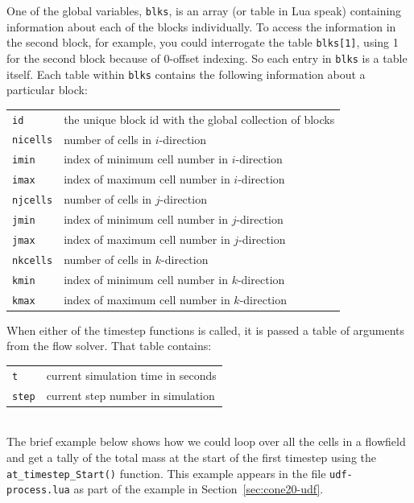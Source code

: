 One of the global variables, \verb!blks!, is an array (or table in Lua speak) containing information 
about each of the blocks individually.
To access the information in the second block, for example, you could interrogate
the table \verb!blks[1]!, using 1 for the second block because of 0-offset indexing.
So each entry in \verb!blks! is a table itself.
Each table within \verb!blks! contains the following information about a particular
block:\\
\begin{tabular}{ll}
 \texttt{id} & the unique block id with the global collection of blocks \\
 \texttt{nicells} & number of cells in $i$-direction \\
 \texttt{imin} & index of minimum cell number in $i$-direction \\
 \texttt{imax} & index of maximum cell number in $i$-direction \\
 \texttt{njcells} & number of cells in $j$-direction \\
 \texttt{jmin} & index of minimum cell number in $j$-direction \\
 \texttt{jmax} & index of maximum cell number in $j$-direction \\
 \texttt{nkcells} & number of cells in $k$-direction \\
 \texttt{kmin} & index of minimum cell number in $k$-direction \\
 \texttt{kmax} & index of maximum cell number in $k$-direction \\
\end{tabular}

When either of the timestep functions is called, it is passed a table of arguments from the flow solver.
That table contains:\\
\begin{tabular}{ll}
 \texttt{t} & current simulation time in seconds \\
 \texttt{step} & current step number in simulation \\
\end{tabular}\\

The brief example below shows how we could loop over all the cells in a flowfield
and get a tally of the total mass at the start
of the first timestep using the \verb!at_timestep_Start()! function.
This example appears in the file \texttt{udf-process.lua} as
part of the example in Section~\ref{sec:cone20-udf}.

